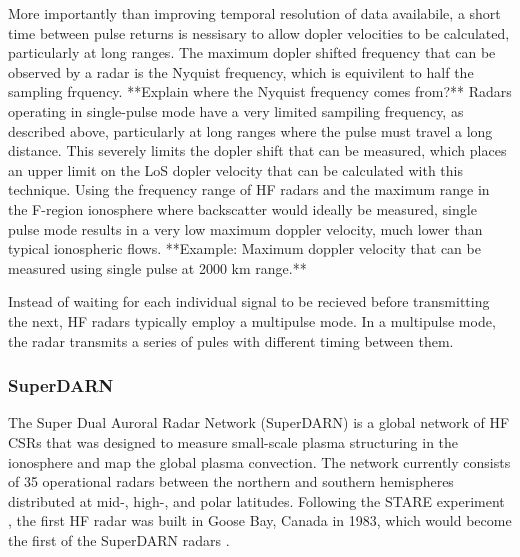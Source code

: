 More importantly than improving temporal resolution of data availabile, a short time between pulse returns is nessisary to allow dopler velocities to be calculated, particularly at long ranges.  The maximum dopler shifted frequency that can be observed by a radar is the Nyquist frequency, which is equivilent to half the sampling frquency.  **Explain where the Nyquist frequency comes from?**  Radars operating in single-pulse mode have a very limited sampiling frequency, as described above, particularly at long ranges where the pulse must travel a long distance.  This severely limits the dopler shift that can be measured, which places an upper limit on the LoS dopler velocity that can be calculated with this technique.  Using the frequency range of HF radars and the maximum range in the F-region ionosphere where backscatter would ideally be measured, single pulse mode results in a very low maximum doppler velocity, much lower than typical ionospheric flows.  **Example: Maximum doppler velocity that can be measured using single pulse at 2000 km range.**

Instead of waiting for each individual signal to be recieved before transmitting the next, HF radars typically employ a multipulse mode. In a multipulse mode, the radar transmits a series of pules with different timing between them.  


\subsubsection{SuperDARN}
The Super Dual Auroral Radar Network (SuperDARN) is a global network of HF CSRs that was designed to measure small-scale plasma structuring in the ionosphere and map the global plasma convection.  The network currently consists of 35 operational radars between the northern and southern hemispheres distributed at mid-, high-, and polar latitudes.  Following the STARE experiment \citep{Greenwald1978}, the first HF radar was built in Goose Bay, Canada in 1983, which would become the first of the SuperDARN radars \citep{Greenwald1985}.  

